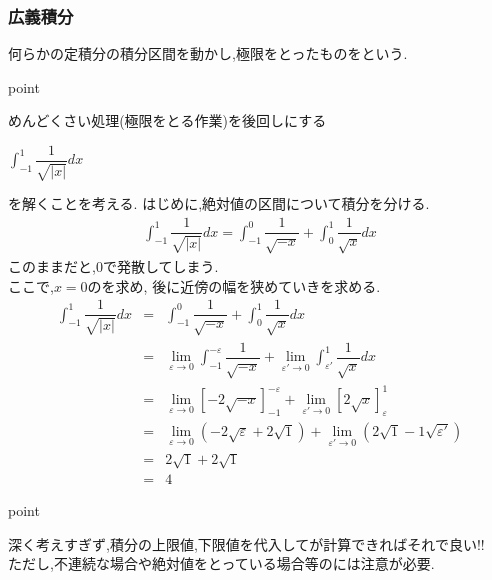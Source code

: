 \documentclass[a4paper]{jsarticle}
\begin{document}
\subsubsection{広義積分}
何らかの定積分の積分区間を動かし,極限をとったものをという.\\
\begin{itembox}[l]{point}
    \begin{center}
        めんどくさい処理(極限をとる作業)を後回しにする
    \end{center}
\end{itembox}
\begin{center}
    $\displaystyle\int ^1_{-1} \dfrac{1}{\sqrt{|x|}}dx$
\end{center}
を解くことを考える.
はじめに,絶対値の区間について積分を分ける.
\begin{eqnarray*}
    \displaystyle\int ^1_{-1} \dfrac{1}{\sqrt{|x|}}dx=\int ^0_{-1} \dfrac{1}{\sqrt{-x}}+\int ^1_{0} \dfrac{1}{\sqrt{x}}dx
\end{eqnarray*}
このままだと,$0$で発散してしまう.\\
ここで,$x=0$のを求め,
後に近傍の幅を狭めていきを求める.
\begin{eqnarray*}
    \displaystyle
    \int ^1_{-1} \dfrac{1}{\sqrt{|x|}}dx&=&\int ^0_{-1} \dfrac{1}{\sqrt{-x}}+\int ^1_{0} \dfrac{1}{\sqrt{x}}dx\\
    &=&\lim_{\varepsilon\rightarrow 0}\int ^{-\varepsilon}_{-1} \dfrac{1}{\sqrt{-x}}+\lim_{\varepsilon'\rightarrow 0}\int ^1_{\varepsilon'} \dfrac{1}{\sqrt{x}}dx\\
    &=&\lim_{\varepsilon\rightarrow 0}\left[-2\sqrt{-x}\right]^{-\varepsilon}_{-1}+\lim_{\varepsilon'\rightarrow0}\left[2\sqrt{x}\right]^{1}_{\varepsilon}\\
    &=&\lim_{\varepsilon\rightarrow 0}\left(-2\sqrt{\varepsilon}+2\sqrt{1}\right)+\lim_{\varepsilon'\rightarrow0}\left(2\sqrt{1}-1\sqrt{\varepsilon'}\right)\\
    &=&2\sqrt{1}+2\sqrt{1}\\
    &=&4
\end{eqnarray*}
\begin{itembox}[l]{point}
    \begin{center}
        深く考えすぎず,積分の上限値,下限値を代入してが計算できればそれで良い!!\\
        ただし,不連続な場合や絶対値をとっている場合等のには注意が必要.
    \end{center}
\end{itembox}
\end{document}
